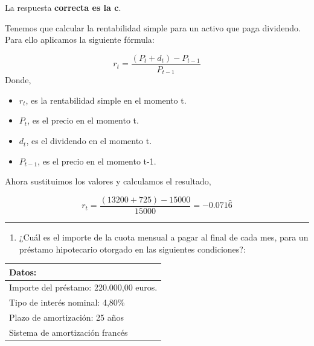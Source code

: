 \documentclass[
  letterpaper,
  DIV=11,
  numbers=noendperiod]{scrreprt}
\providecommand{\tightlist}{%
  \setlength{\itemsep}{0pt}\setlength{\parskip}{0pt}}\usepackage{longtable,booktabs,array}
\begin{document}
\begin{tcolorbox}[enhanced jigsaw, left=2mm, opacityback=0, colback=white, breakable, arc=.35mm, bottomrule=.15mm, rightrule=.15mm, toprule=.15mm, leftrule=.75mm, colframe=quarto-callout-tip-color-frame]
\begin{minipage}[t]{5.5mm}
\textcolor{quarto-callout-tip-color}{\faLightbulb}
\end{minipage}%
\begin{minipage}[t]{\textwidth - 5.5mm}

La respuesta \textbf{correcta es la c}.

Tenemos que calcular la rentabilidad simple para un activo que paga
dividendo. Para ello aplicamos la siguiente fórmula:

\[r_t=\frac{\left(P_t+d_t\right)-P_{t-1}}{P_{t-1}}\] Donde,

\begin{itemize}
\item
  \(r_t\), es la rentabilidad simple en el momento t.
\item
  \(P_t\), es el precio en el momento t.
\item
  \(d_t\), es el dividendo en el momento t.
\item
  \(P_{t-1}\), es el precio en el momento t-1.
\end{itemize}

Ahora sustituimos los valores y calculamos el resultado,

\[r_t=\frac{\left(13200+725\right)-15000}{15000}=-0.071\hat{6}\]

\end{minipage}%
\end{tcolorbox}

\begin{center}\rule{0.5\linewidth}{0.5pt}\end{center}

\begin{enumerate}
\def\labelenumi{\arabic{enumi}.}
\setcounter{enumi}{60}
\tightlist
\item
  ¿Cuál es el importe de la cuota mensual a pagar al final de cada mes,
  para un préstamo hipotecario otorgado en las siguientes condiciones?:
\end{enumerate}

\begin{longtable}[]{@{}l@{}}
\toprule()
\textbf{Datos:} \\
\midrule()
\endhead
Importe del préstamo: 220.000,00 euros. \\
Tipo de interés nominal: 4,80\% \\
Plazo de amortización: 25 años \\
Sistema de amortización francés \\
\bottomrule()
\end{longtable}
\end{document}
